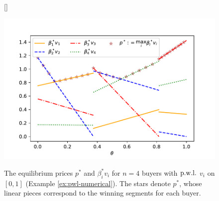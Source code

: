 
\begin{figure}
	[\FBwidth]
	{\caption{The equilibrium prices $p^*$ and $\beta^*_i v_i$ for $n=4$ buyers with ${\rm p.w.l.}$ $v_i$ on $[0,1]$ (Example \ref{ex:pwl-numerical}). The stars denote $p^*$, whose linear pieces correspond to the winning segments for each buyer.}
	\label{fig:n-pwl} }
	{ \includegraphics[scale=0.5]{codes/n-pwl.pdf} }
\end{figure}

